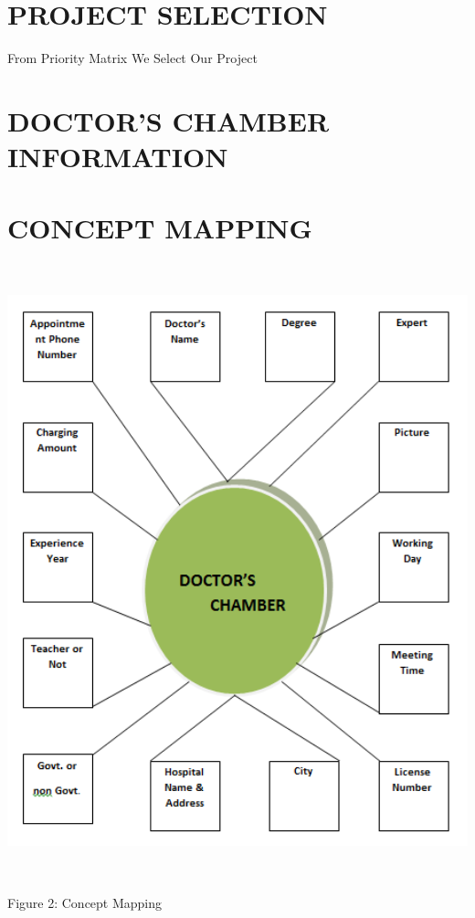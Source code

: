 \documentclass[12pt]{article}
\begin{document}
\section{PROJECT SELECTION}
{From Priority Matrix We Select Our Project}
\section*{DOCTOR’S CHAMBER INFORMATION}
\pagebreak


   
   
    


\section{CONCEPT MAPPING}


 
\includegraphics[height=7in]{Mapping.PNG}
\cite{3}
\begin{center}
 \caption{ Figure 2: Concept Mapping}
    
\end{center}
\end{document}
